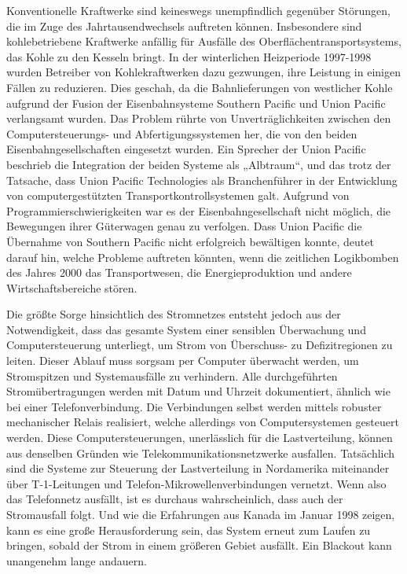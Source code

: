 \documentclass[
  a5paper,
  smalldemyvopaper,10pt,twoside,onecolumn,openright,extrafontsizes,hidelinks]{memoir}
\begin{document}
Konventionelle Kraftwerke sind keineswegs unempfindlich gegenüber
Störungen, die im Zuge des Jahrtausendwechsels auftreten können.
Insbesondere sind kohlebetriebene Kraftwerke anfällig für Ausfälle des
Oberflächentransportsystems, das Kohle zu den Kesseln bringt. In der
winterlichen Heizperiode 1997-1998 wurden Betreiber von Kohlekraftwerken
dazu gezwungen, ihre Leistung in einigen Fällen zu reduzieren. Dies
geschah, da die Bahnlieferungen von westlicher Kohle aufgrund der Fusion
der Eisenbahnsysteme Southern Pacific und Union Pacific verlangsamt
wurden. Das Problem rührte von Unverträglichkeiten zwischen den
Computersteuerungs- und Abfertigungssystemen her, die von den beiden
Eisenbahngesellschaften eingesetzt wurden. Ein Sprecher der Union
Pacific beschrieb die Integration der beiden Systeme als „Albtraum``,
und das trotz der Tatsache, dass Union Pacific Technologies als
Branchenführer in der Entwicklung von computergestützten
Transportkontrollsystemen galt. Aufgrund von Programmierschwierigkeiten
war es der Eisenbahngesellschaft nicht möglich, die Bewegungen ihrer
Güterwagen genau zu verfolgen. Dass Union Pacific die Übernahme von
Southern Pacific nicht erfolgreich bewältigen konnte, deutet darauf hin,
welche Probleme auftreten könnten, wenn die zeitlichen Logikbomben des
Jahres 2000 das Transportwesen, die Energieproduktion und andere
Wirtschaftsbereiche stören.

Die größte Sorge hinsichtlich des Stromnetzes entsteht jedoch aus der
Notwendigkeit, dass das gesamte System einer sensiblen Überwachung und
Computersteuerung unterliegt, um Strom von Überschuss- zu
Defizitregionen zu leiten. Dieser Ablauf muss sorgsam per Computer
überwacht werden, um Stromspitzen und Systemausfälle zu verhindern. Alle
durchgeführten Stromübertragungen werden mit Datum und Uhrzeit
dokumentiert, ähnlich wie bei einer Telefonverbindung. Die Verbindungen
selbst werden mittels robuster mechanischer Relais realisiert, welche
allerdings von Computersystemen gesteuert werden. Diese
Computersteuerungen, unerlässlich für die Lastverteilung, können aus
denselben Gründen wie Telekommunikationsnetzwerke ausfallen. Tatsächlich
sind die Systeme zur Steuerung der Lastverteilung in Nordamerika
miteinander über T-1-Leitungen und Telefon-Mikrowellenverbindungen
vernetzt. Wenn also das Telefonnetz ausfällt, ist es durchaus
wahrscheinlich, dass auch der Stromausfall folgt. Und wie die
Erfahrungen aus Kanada im Januar 1998 zeigen, kann es eine große
Herausforderung sein, das System erneut zum Laufen zu bringen, sobald
der Strom in einem größeren Gebiet ausfällt. Ein Blackout kann
unangenehm lange andauern.
\end{document}
